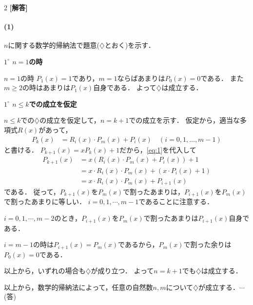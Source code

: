 \documentclass[../../main.tex]{subfiles}
\begin{document}
\setcounter{equation}{0}
\begin{oframed}
  
\end{oframed}
\setlength{\columnseprule}{0.4pt}
\begin{multicols}{2}
  {\bf [解答]}

  \paragraph{(1)}
  $n$に関する数学的帰納法で題意($\diamondsuit$とおく)を示す．

  \textbf{$1^{\circ}$ $n=1$の時}

  $n=1$の時 $P_1(x)=1$であり，$m=1$ならばあまりは$P_0(x)=0$である．
  また$m \ge 2$の時はあまりは$P_{1}(x)$自身である．
  よって$\diamondsuit$は成立する．

  \textbf{$1^{\circ}$ $n\le k$での成立を仮定}

  $n \le k$での$\diamondsuit$の成立を仮定して，$n=k+1$での成立を示す．
  仮定から，適当な多項式$R(x)$があって，
  \begin{align}
    P_k(x) & = R_i(x) \cdot P_m(x) + P_i(x) \quad (i=0,1,\dots,m-1) \label{eq:1}
  \end{align}
  と書ける．
  $P_{k+1}(x)=x P_k(x)+1$だから，\cref{eq:1}を代入して
  \begin{align}
    P_{k+1}(x)
    & = x \left(R_i(x) \cdot P_m(x) + P_i(x) \right) + 1               \\
    & = x \cdot R_i(x) \cdot P_m(x) + \left(x \cdot P_i(x) + 1 \right) \\
    & = x \cdot R_i(x) \cdot P_m(x) + P_{i+1}(x) \label{eq:2}
  \end{align}
  である．
  従って，$P_{k+1}(x)$を$P_m(x)$で割ったあまりは，$P_{i+1}(x)$を$P_m(x)$で割ったあまりに等しい．
  $i=0,1,\cdots, m-1$であることに注意する．

  $i=0,1,\cdots,m-2$のとき，$P_{i+1}(x)$を$P_m(x)$で割ったあまりは$P_{i+1}(x)$自身である．

  $i=m-1$の時は$P_{i+1}(x)=P_{m}(x)$であるから，$P_m(x)$で割った余りは$P_0(x)=0$である．

  以上から，いずれの場合も$\diamondsuit$が成り立つ．
  よって$n=k+1$でも$\diamondsuit$は成立する．

  以上から，数学的帰納法によって，任意の自然数$n,m$について$\diamondsuit$が成立する．$\cdots$(答)


\end{multicols}
\end{document}
